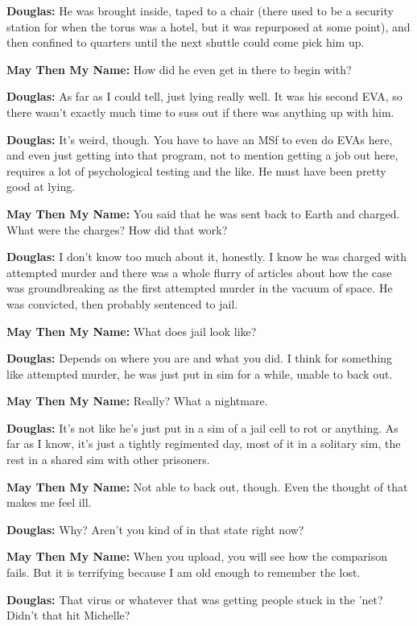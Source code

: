 \textbf{Douglas:} He was brought inside, taped to a chair (there used to be a security station for when the torus was a hotel, but it was repurposed at some point), and then confined to quarters until the next shuttle could come pick him up.

\textbf{May Then My Name:} How did he even get in there to begin with?

\textbf{Douglas:} As far as I could tell, just lying really well. It was his second EVA, so there wasn't exactly much time to suss out if there was anything up with him.

\textbf{Douglas:} It's weird, though. You have to have an MSf to even do EVAs here, and even just getting into that program, not to mention getting a job out here, requires a lot of psychological testing and the like. He must have been pretty good at lying.

\textbf{May Then My Name:} You said that he was sent back to Earth and charged. What were the charges? How did that work?

\textbf{Douglas:} I don't know too much about it, honestly. I know he was charged with attempted murder and there was a whole flurry of articles about how the case was groundbreaking as the first attempted murder in the vacuum of space. He was convicted, then probably sentenced to jail.

\textbf{May Then My Name:} What does jail look like?

\textbf{Douglas:} Depends on where you are and what you did. I think for something like attempted murder, he was just put in sim for a while, unable to back out.

\textbf{May Then My Name:} Really? What a nightmare.

\textbf{Douglas:} It's not like he's just put in a sim of a jail cell to rot or anything. As far as I know, it's just a tightly regimented day, most of it in a solitary sim, the rest in a shared sim with other prisoners.

\textbf{May Then My Name:} Not able to back out, though. Even the thought of that makes me feel ill.

\textbf{Douglas:} Why? Aren't you kind of in that state right now?

\textbf{May Then My Name:} When you upload, you will see how the comparison fails. But it is terrifying because I am old enough to remember the lost.

\textbf{Douglas:} That virus or whatever that was getting people stuck in the 'net? Didn't that hit Michelle?

